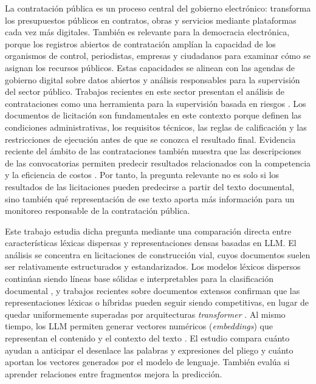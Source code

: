 La contratación pública es un proceso central del gobierno electrónico: transforma los presupuestos públicos en contratos, obras y servicios mediante plataformas cada vez más digitales. También es relevante para la democracia electrónica, porque los registros abiertos de contratación amplían la capacidad de los organismos de control, periodistas, empresas y ciudadanos para examinar cómo se asignan los recursos públicos. Estas capacidades se alinean con las agendas de gobierno digital sobre datos abiertos y análisis responsables para la supervisión del sector público. Trabajos recientes en este sector presentan el análisis de contrataciones como una herramienta para la supervisión basada en riesgos \parencite{salazar2024vigia}. Los documentos de licitación son fundamentales en este contexto porque definen las condiciones administrativas, los requisitos técnicos, las reglas de calificación y las restricciones de ejecución antes de que se conozca el resultado final. Evidencia reciente del ámbito de las contrataciones también muestra que las descripciones de las convocatorias permiten predecir resultados relacionados con la competencia y la eficiencia de costos \parencite{acikalin2024procurementcalls}. Por tanto, la pregunta relevante no es solo si los resultados de las licitaciones pueden predecirse a partir del texto documental, sino también qué representación de ese texto aporta más información para un monitoreo responsable de la contratación pública.

Este trabajo estudia dicha pregunta mediante una comparación directa entre características léxicas dispersas y representaciones densas basadas en LLM. El análisis se concentra en licitaciones de construcción vial, cuyos documentos suelen ser relativamente estructurados y estandarizados. Los modelos léxicos dispersos continúan siendo líneas base sólidas e interpretables para la clasificación documental \parencite{wang2012baselines}, y trabajos recientes sobre documentos extensos confirman que las representaciones léxicas o híbridas pueden seguir siendo competitivas, en lugar de quedar uniformemente superadas por arquitecturas \textit{transformer} \parencite{alvaprincipe2025survey}. Al mismo tiempo, los LLM permiten generar vectores numéricos (\textit{embeddings}) que representan el contenido y el contexto del texto \parencite{wang2024improvingembeddings}. El estudio compara cuánto ayudan a anticipar el desenlace las palabras y expresiones del pliego y cuánto aportan los vectores generados por el modelo de lenguaje. También evalúa si aprender relaciones entre fragmentos mejora la predicción.

